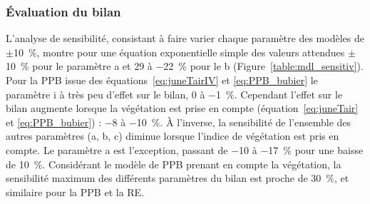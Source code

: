 \subsubsection{Évaluation du bilan}


L'analyse de sensibilité, consistant à faire varier chaque paramètre des modèles de $\pm$\SI{10}{\percent}, montre pour une équation exponentielle simple des valeurs attendues $\pm$\SI{10}{\percent} pour le paramètre a et \num{+29} à \SI{-22}{\percent} pour le b (Figure~\ref{table:mdl_sensitiv}).
Pour la PPB issue des équations~\ref{eq:juneTairIV} et \ref{eq:PPB_bubier} le paramètre i à très peu d'effet sur le bilan, \num{0} à \SI{-1}{\percent}.
Cependant l'effet sur le bilan augmente lorsque la végétation est prise en compte (équation~\ref{eq:juneTair} et \ref{eq:PPB_bubier}) : \num{-8} à \SI{-10}{\percent}.
À l'inverse, la sensibilité de l'ensemble des autres paramètres (a, b, c) diminue lorsque l'indice de végétation est pris en compte.
Le paramètre a est l'exception, passant de \num{-10} à \SI{-17}{\percent} pour une baisse de \SI{10}{\percent}.
Considérant le modèle de PPB prenant en compte la végétation, la sensibilité maximum des différents paramètres du bilan est proche de \SI{30}{\percent}, et similaire pour la PPB et la RE.

